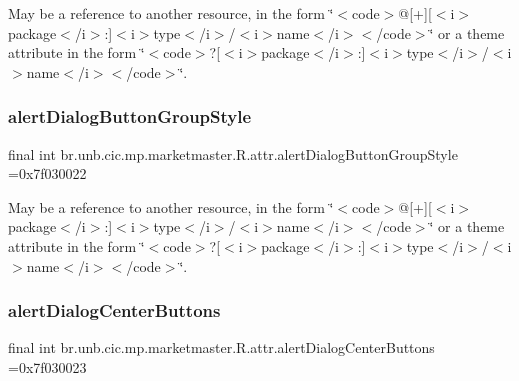 May be a reference to another resource, in the form \char`\"{}$<$code$>$@\mbox{[}+\mbox{]}\mbox{[}$<$i$>$package$<$/i$>$\+:\mbox{]}$<$i$>$type$<$/i$>$/$<$i$>$name$<$/i$>$$<$/code$>$\char`\"{} or a theme attribute in the form \char`\"{}$<$code$>$?\mbox{[}$<$i$>$package$<$/i$>$\+:\mbox{]}$<$i$>$type$<$/i$>$/$<$i$>$name$<$/i$>$$<$/code$>$\char`\"{}. \mbox{\label{classbr_1_1unb_1_1cic_1_1mp_1_1marketmaster_1_1R_1_1attr_a243fba4b73a76ae8c7f38d29aa9dcb5d}} 
\subsubsection{\texorpdfstring{alert\+Dialog\+Button\+Group\+Style}{alertDialogButtonGroupStyle}}
{\footnotesize\ttfamily final int br.\+unb.\+cic.\+mp.\+marketmaster.\+R.\+attr.\+alert\+Dialog\+Button\+Group\+Style =0x7f030022\hspace{0.3cm}{\ttfamily [static]}}

May be a reference to another resource, in the form \char`\"{}$<$code$>$@\mbox{[}+\mbox{]}\mbox{[}$<$i$>$package$<$/i$>$\+:\mbox{]}$<$i$>$type$<$/i$>$/$<$i$>$name$<$/i$>$$<$/code$>$\char`\"{} or a theme attribute in the form \char`\"{}$<$code$>$?\mbox{[}$<$i$>$package$<$/i$>$\+:\mbox{]}$<$i$>$type$<$/i$>$/$<$i$>$name$<$/i$>$$<$/code$>$\char`\"{}. \mbox{\label{classbr_1_1unb_1_1cic_1_1mp_1_1marketmaster_1_1R_1_1attr_a20f2cf07c7d2121149a3700f3571ceaa}} 
\subsubsection{\texorpdfstring{alert\+Dialog\+Center\+Buttons}{alertDialogCenterButtons}}
{\footnotesize\ttfamily final int br.\+unb.\+cic.\+mp.\+marketmaster.\+R.\+attr.\+alert\+Dialog\+Center\+Buttons =0x7f030023\hspace{0.3cm}{\ttfamily [static]}}

